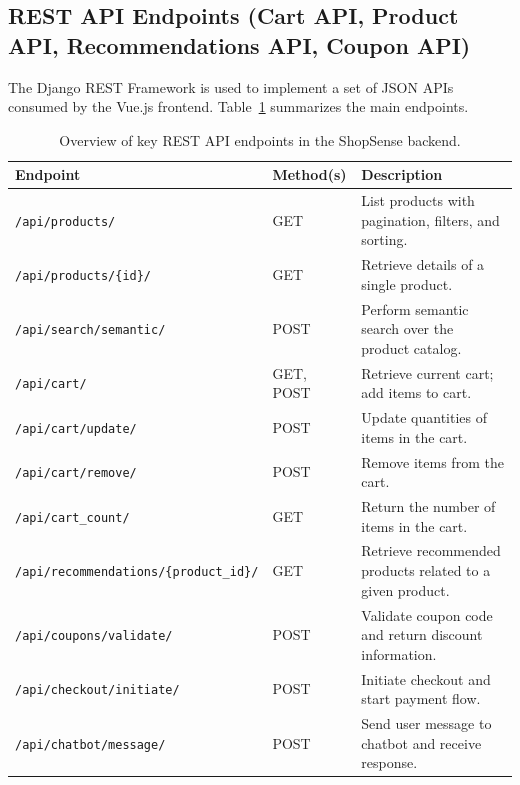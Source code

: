 \subsection{REST API Endpoints (Cart API, Product API, Recommendations API, Coupon API)}
The Django REST Framework is used to implement a set of JSON APIs consumed by the Vue.js frontend. Table~\ref{tab:api-overview} summarizes the main endpoints.

\begin{table}[H]
  \centering
  \caption{Overview of key REST API endpoints in the ShopSense backend.}
  \label{tab:api-overview}
  \begin{tabular}{p{4.5cm}p{2cm}p{6.5cm}}
    \toprule
    \textbf{Endpoint} & \textbf{Method(s)} & \textbf{Description} \\
    \midrule
    \texttt{/api/products/} & GET & List products with pagination, filters, and sorting. \\
    \midrule
    \texttt{/api/products/\{id\}/} & GET & Retrieve details of a single product. \\
    \midrule
    \texttt{/api/search/semantic/} & POST & Perform semantic search over the product catalog. \\
    \midrule
    \texttt{/api/cart/} & GET, POST & Retrieve current cart; add items to cart. \\
    \midrule
    \texttt{/api/cart/update/} & POST & Update quantities of items in the cart. \\
    \midrule
    \texttt{/api/cart/remove/} & POST & Remove items from the cart. \\
    \midrule
    \texttt{/api/cart\_count/} & GET & Return the number of items in the cart. \\
    \midrule
    \texttt{/api/recommendations/\newline\{product\_id\}/} & GET & Retrieve recommended products related to a given product. \\
    \midrule
    \texttt{/api/coupons/validate/} & POST & Validate coupon code and return discount information. \\
    \midrule
    \texttt{/api/checkout/initiate/} & POST & Initiate checkout and start payment flow. \\
    \midrule
    \texttt{/api/chatbot/message/} & POST & Send user message to chatbot and receive response. \\
    \bottomrule
  \end{tabular}
\end{table}

